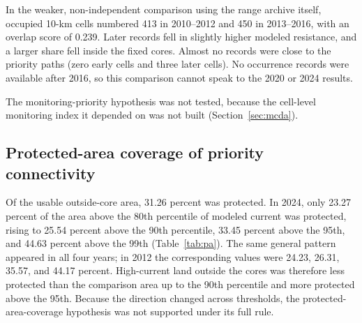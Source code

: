 In the weaker, non-independent comparison using the range archive itself, occupied 10-km cells numbered 413 in 2010--2012 and 450 in 2013--2016, with an overlap score of 0.239. Later records fell in slightly higher modeled resistance, and a larger share fell inside the fixed cores. Almost no records were close to the priority paths (zero early cells and three later cells). No occurrence records were available after 2016, so this comparison cannot speak to the 2020 or 2024 results.

The monitoring-priority hypothesis was not tested, because the cell-level monitoring index it depended on was not built (Section~\ref{sec:mcda}).
\FloatBarrier

\subsection{Protected-area coverage of priority connectivity}

Of the usable outside-core area, 31.26 percent was protected. In 2024, only 23.27 percent of the area above the 80th percentile of modeled current was protected, rising to 25.54 percent above the 90th percentile, 33.45 percent above the 95th, and 44.63 percent above the 99th (Table~\ref{tab:pa}). The same general pattern appeared in all four years; in 2012 the corresponding values were 24.23, 26.31, 35.57, and 44.17 percent. High-current land outside the cores was therefore less protected than the comparison area up to the 90th percentile and more protected above the 95th. Because the direction changed across thresholds, the protected-area-coverage hypothesis was not supported under its full rule.

\begin{table}[htbp]\centering
  \caption{Protected-area coverage of modeled high-current classes.}
  \label{tab:pa}
  
\end{table}
\FloatBarrier
